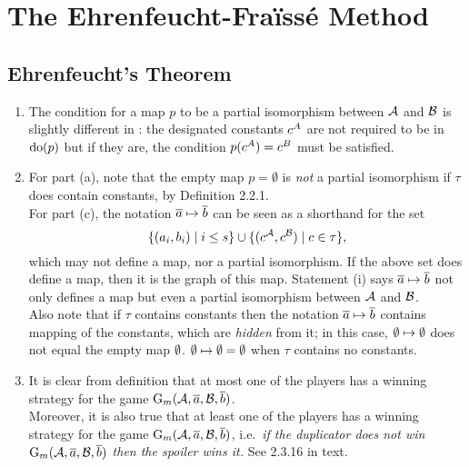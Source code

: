 \chapter{The Ehrenfeucht-Fra\"{i}ss\'{e} Method}
\setcounter{section}{1}
\section{Ehrenfeucht's Theorem}
\begin{enumerate}[1.]
%
\item {} The condition for a map $p$ to be a partial isomorphism between $\mathcal{A}$ and $\mathcal{B}$ is slightly different in \cite{EFT}: the designated constants $c^{A}$ are not required to be in ${\mathrm{do}({p})}$ but if they are, the condition $p(c^{A}) = c^{B}$ must be satisfied.
%
\item {} For part (a), note that the empty map $p = \emptyset$ is \emph{not} a partial isomorphism if $\tau$ does contain constants, by Definition 2.2.1.
\medskip\\
For part (c), the notation $\overline{a} \mapsto \overline{b}$ can be seen as a shorthand for the set
\[
{\{(a_i, b_i) \mid i \leq s\}} \cup {\{(c^{\mathcal{A}}, c^{\mathcal{B}}) \mid c \in \tau\}},\]
which may not define a map, nor a partial isomorphism. If the above set does define a map, then it is the graph of this map. Statement (i) says $\overline{a} \mapsto \overline{b}$ not only defines a map but even a partial isomorphism between $\mathcal{A}$ and $\mathcal{B}$.
\medskip\\
Also note that if $\tau$ contains constants then the notation $\overline{a} \mapsto \overline{b}$ contains mapping of the constants, which are \emph{hidden} from it; in this case, $\emptyset \mapsto \emptyset$ does not equal the empty map $\emptyset$. $\emptyset \mapsto \emptyset = \emptyset$ when $\tau$ contains no constants.
%
\item {} It is clear from definition that at most one of the players has a winning strategy for the game $\game{m}{\strct{A}, \vect{a}, \strct{B}, \vect{b}}$.
\medskip\\
Moreover, it is also true that at least one of the players has a winning strategy for the game $\game{m}{\strct{A}, \vect{a}, \strct{B}, \vect{b}}$, i.e.\ \emph{if the duplicator does not win $\game{m}{\strct{A}, \vect{a}, \strct{B}, \vect{b}}$ then the spoiler wins it.} See 2.3.16 in text.

\end{enumerate}
